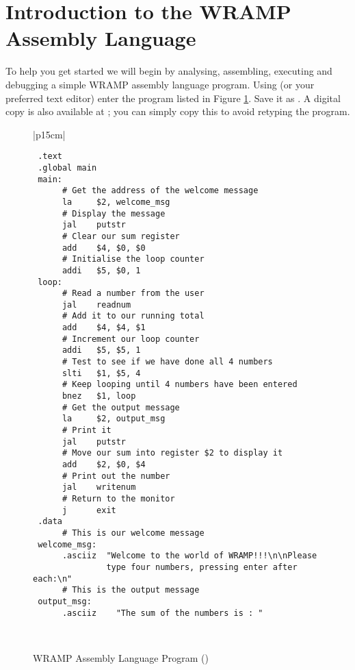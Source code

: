 \section{Introduction to the WRAMP Assembly Language} %
%
To help you get started we will begin by analysing,  assembling, 
executing and debugging a simple WRAMP assembly language program.
Using  (or your preferred text editor) enter the  
program listed in Figure \ref{simple_prog}. Save it as . A digital copy is also available at ; you can simply copy this to avoid retyping the program.

%
%
\begin{figure}[btp]
\begin{center}
\begin{tabular}{|p{15cm}|}
\hline
\begin{verbatim}
 .text
 .global main
 main:
      # Get the address of the welcome message
      la     $2, welcome_msg
      # Display the message
      jal    putstr
      # Clear our sum register
      add    $4, $0, $0
      # Initialise the loop counter
      addi   $5, $0, 1
 loop:
      # Read a number from the user
      jal    readnum
      # Add it to our running total
      add    $4, $4, $1
      # Increment our loop counter
      addi   $5, $5, 1
      # Test to see if we have done all 4 numbers
      slti   $1, $5, 4
      # Keep looping until 4 numbers have been entered
      bnez   $1, loop
      # Get the output message
      la     $2, output_msg
      # Print it
      jal    putstr
      # Move our sum into register $2 to display it
      add    $2, $0, $4
      # Print out the number
      jal    writenum
      # Return to the monitor
      j      exit
 .data
      # This is our welcome message
 welcome_msg:
      .asciiz  "Welcome to the world of WRAMP!!!\n\nPlease
               type four numbers, pressing enter after each:\n"
      # This is the output message
 output_msg:
      .asciiz    "The sum of the numbers is : "
\end{verbatim}%

\\
\hline
\end{tabular}
\end{center}
\caption{WRAMP Assembly Language Program ()}
\label{simple_prog}
\end{figure}
%

